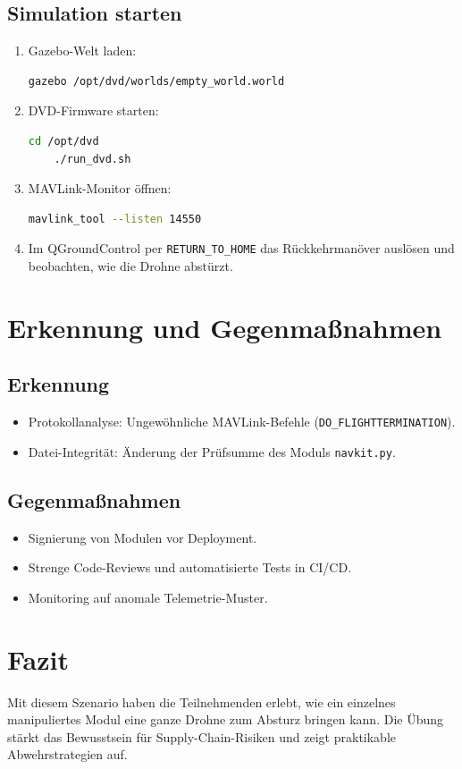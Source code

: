 \documentclass[a4paper,12pt]{report}
\begin{document}
\section{Simulation starten}
\begin{enumerate}
  \item Gazebo-Welt laden:
    \begin{lstlisting}[language=bash]
    gazebo /opt/dvd/worlds/empty_world.world
    \end{lstlisting}
  \item DVD-Firmware starten:
    \begin{lstlisting}[language=bash]
    cd /opt/dvd
    ./run_dvd.sh
    \end{lstlisting}
  \item MAVLink-Monitor öffnen:
    \begin{lstlisting}[language=bash]
    mavlink_tool --listen 14550
    \end{lstlisting}
  \item Im QGroundControl per \texttt{RETURN\_TO\_HOME} das Rückkehrmanöver auslösen und beobachten, wie die Drohne abstürzt.
\end{enumerate}

\chapter{Erkennung und Gegenmaßnahmen}
\section{Erkennung}
\begin{itemize}
  \item Protokollanalyse: Ungewöhnliche MAVLink-Befehle (\texttt{DO\_FLIGHTTERMINATION}).
  \item Datei-Integrität: Änderung der Prüfsumme des Moduls \texttt{navkit.py}.
\end{itemize}

\section{Gegenmaßnahmen}
\begin{itemize}
  \item Signierung von Modulen vor Deployment.
  \item Strenge Code-Reviews und automatisierte Tests in CI/CD.
  \item Monitoring auf anomale Telemetrie-Muster.
\end{itemize}

\chapter{Fazit}
Mit diesem Szenario haben die Teilnehmenden erlebt, wie ein einzelnes manipuliertes Modul eine ganze Drohne zum Absturz bringen kann. Die Übung stärkt das Bewusstsein für Supply-Chain-Risiken und zeigt praktikable Abwehrstrategien auf.
\end{document}

